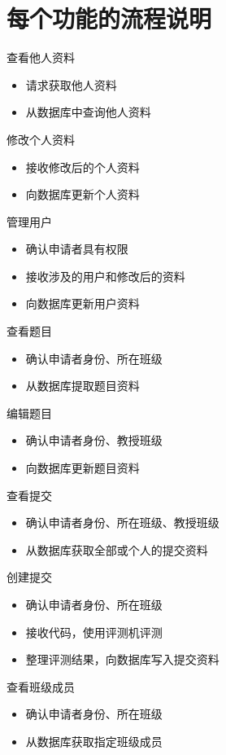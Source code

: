 \documentclass{ctexart}
\begin{document}
\section{每个功能的流程说明}

查看他人资料
\begin{itemize}
    \item 请求获取他人资料
    \item 从数据库中查询他人资料
\end{itemize}

修改个人资料
\begin{itemize}
    \item 接收修改后的个人资料
    \item 向数据库更新个人资料
\end{itemize}

管理用户
\begin{itemize}
    \item 确认申请者具有权限
    \item 接收涉及的用户和修改后的资料
    \item 向数据库更新用户资料
\end{itemize}

查看题目
\begin{itemize}
    \item 确认申请者身份、所在班级
    \item 从数据库提取题目资料
\end{itemize}

编辑题目
\begin{itemize}
    \item 确认申请者身份、教授班级
    \item 向数据库更新题目资料
\end{itemize}

查看提交
\begin{itemize}
    \item 确认申请者身份、所在班级、教授班级
    \item 从数据库获取全部或个人的提交资料
\end{itemize}

创建提交
\begin{itemize}
    \item 确认申请者身份、所在班级
    \item 接收代码，使用评测机评测
    \item 整理评测结果，向数据库写入提交资料
\end{itemize}

查看班级成员
\begin{itemize}
    \item 确认申请者身份、所在班级
    \item 从数据库获取指定班级成员
\end{itemize}
\end{document}
